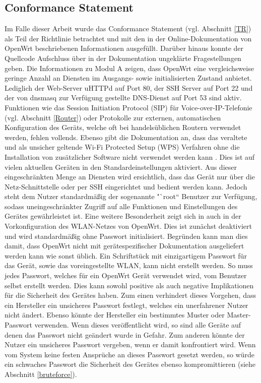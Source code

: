 \documentclass[a4paper]{book}
\begin{document}
\begin{large}
\subsection{Conformance Statement}
\label{ICS}
\begin{onehalfspace}
Im Falle dieser Arbeit wurde das \glqq Conformance Statement\grqq{} (vgl. Abschnitt \ref{TR}) als Teil der Richtlinie betrachtet und mit den in der Online-Dokumentation von OpenWrt beschriebenen Informationen ausgefüllt. Darüber hinaus konnte der Quellcode Aufschluss über in der Dokumentation ungeklärte Fragestellungen geben. Die Informationen zu Modul A zeigen, dass OpenWrt eine vergleichsweise geringe Anzahl an Diensten im Ausgangs- sowie initialisierten Zustand anbietet. Lediglich der Web-Server uHTTPd auf Port 80, der SSH Server auf Port 22 und der von dnsmasq zur Verfügung gestellte DNS-Dienst auf Port 53 sind aktiv. Funktionen wie das Session Initiation Protocol (SIP) für Voice-over-IP-Telefonie (vgl. Abschnitt \ref{Router}) oder Protokolle zur externen, automatischen Konfiguration des Geräts, welche oft bei handelsüblichen Routern verwendet werden, fehlen vollends. Ebenso gibt die Dokumentation an, dass das veraltete und als unsicher geltende Wi-Fi Protected Setup (WPS) Verfahren ohne die Installation von zusätzlicher Software nicht verwendet werden kann \cite{StefanViehbock.2011}. Dies ist auf vielen aktuellen Geräten in den Standardeinstellungen aktiviert. Aus dieser eingeschränkten Menge an Diensten wird ersichtlich, dass das Gerät nur über die Netz-Schnittstelle oder per SSH eingerichtet und bedient werden kann. Jedoch steht dem Nutzer standardmäßig der sogenannte "`root“ Benutzer zur Verfügung, sodass uneingeschränkter Zugriff auf alle Funktionen und Einstellungen des Gerätes gewährleistet ist. Eine weitere \mbox Besonderheit zeigt sich in auch in der Vorkonfiguration des WLAN-Netzes von OpenWrt. Dies ist zunächst deaktiviert und wird standardmäßig ohne Passwort initialisiert. Begründen kann man dies damit, dass OpenWrt nicht mit gerätespezifischer Dokumentation ausgeliefert werden kann wie sonst üblich. Ein Schriftstück mit einzigartigem Passwort für das Gerät, sowie das voreingestellte WLAN, kann nicht erstellt werden. So muss jedes Passwort, welches für ein OpenWrt Gerät verwendet wird, vom Benutzer selbst erstellt werden. Dies kann sowohl positive als auch negative Implikationen für die Sicherheit des Gerätes haben. Zum einen verhindert dieses Vorgehen, dass ein Hersteller ein unsicheres Passwort festlegt, welches ein unerfahrener Nutzer nicht ändert. Ebenso könnte der Hersteller ein bestimmtes Muster oder Master-Passwort verwenden. Wenn dieses veröffentlicht wird, so sind alle Geräte auf denen das Passwort nicht geändert wurde in Gefahr. Zum anderen könnte der Nutzer ein unsicheres Passwort vergeben, wenn er damit konfrontiert wird. Wenn vom System keine festen Ansprüche an dieses Passwort gesetzt werden, so würde ein schwaches Passwort die Sicherheit des Gerätes ebenso kompromittieren (siehe Abschnitt \ref{bruteforce}). \newline\indent	

\end{onehalfspace}
\end{large}
\end{document}
